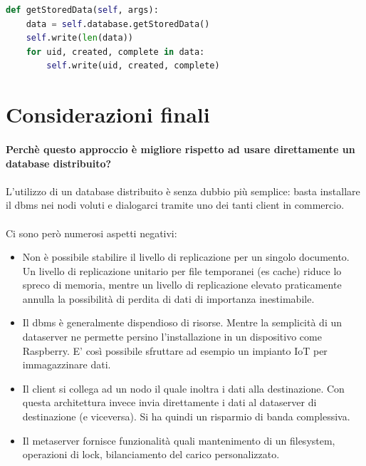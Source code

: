 \documentclass{article}
\begin{document}
\begin{lstlisting}[language=Python, title=Dataserver]
def getStoredData(self, args):
    data = self.database.getStoredData()
    self.write(len(data))
    for uid, created, complete in data:
        self.write(uid, created, complete)
\end{lstlisting}


\section{Considerazioni finali}

\paragraph{Perchè questo approccio è migliore rispetto ad usare direttamente un database distribuito?} 

\paragraph{} L'utilizzo di un database distribuito è senza dubbio più semplice: basta installare il dbms nei nodi voluti e dialogarci tramite uno dei tanti client in commercio. 

\paragraph{} Ci sono però numerosi aspetti negativi: \begin{itemize}
	\item Non è possibile stabilire il livello di replicazione per un singolo documento. Un livello di replicazione unitario per file temporanei (es cache) riduce lo spreco di memoria, mentre un livello di replicazione elevato praticamente annulla la possibilità di perdita di dati di importanza inestimabile.
	\item Il dbms è generalmente dispendioso di risorse. Mentre la semplicità di un dataserver ne permette persino l'installazione in un dispositivo come Raspberry. E' così possibile sfruttare ad esempio un impianto IoT per immagazzinare dati. 
	\item Il client si collega ad un nodo il quale inoltra i dati alla destinazione. Con questa architettura invece invia direttamente i dati al dataserver di destinazione (e viceversa). Si ha quindi un risparmio di banda complessiva.  
	\item Il metaserver fornisce funzionalità quali mantenimento di un filesystem, operazioni di lock, bilanciamento del carico personalizzato. 
\end{itemize}
\end{document}
